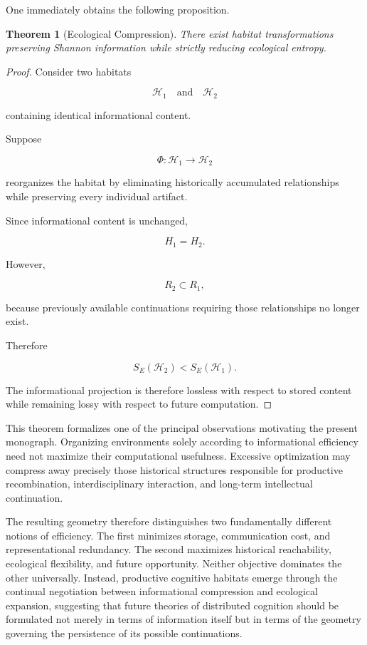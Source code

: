 \documentclass[12pt,oneside]{article}
\newtheorem{theorem}[definition]{Theorem}
\theoremstyle{remark}
\begin{document}
One immediately obtains the following proposition.

\begin{theorem}[Ecological Compression]

There exist habitat transformations preserving Shannon information while
strictly reducing ecological entropy.

\end{theorem}

\begin{proof}

Consider two habitats

\[
\mathcal H_1
\quad
\text{and}
\quad
\mathcal H_2
\]

containing identical informational content.

Suppose

\[
\Phi
:
\mathcal H_1
\rightarrow
\mathcal H_2
\]

reorganizes the habitat by eliminating historically accumulated relationships
while preserving every individual artifact.

Since informational content is unchanged,

\[
H_1
=
H_2.
\]

However,

\[
R_2
\subset
R_1,
\]

because previously available continuations requiring those relationships no
longer exist.

Therefore

\[
S_E(\mathcal H_2)
<
S_E(\mathcal H_1).
\]

The informational projection is therefore lossless with respect to stored
content while remaining lossy with respect to future computation.

\end{proof}

This theorem formalizes one of the principal observations motivating the present
monograph. Organizing environments solely according to informational efficiency
need not maximize their computational usefulness. Excessive optimization may
compress away precisely those historical structures responsible for productive
recombination, interdisciplinary interaction, and long-term intellectual
continuation.

The resulting geometry therefore distinguishes two fundamentally different
notions of efficiency. The first minimizes storage, communication cost, and
representational redundancy. The second maximizes historical reachability,
ecological flexibility, and future opportunity. Neither objective dominates the
other universally. Instead, productive cognitive habitats emerge through the
continual negotiation between informational compression and ecological
expansion, suggesting that future theories of distributed cognition should be
formulated not merely in terms of information itself but in terms of the
geometry governing the persistence of its possible continuations.
\end{document}
